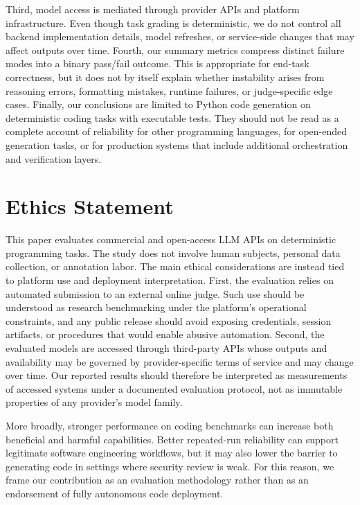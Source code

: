 \documentclass[11pt]{article}
\begin{document}
Third, model access is mediated through provider APIs and platform infrastructure. Even though task grading is deterministic, we do not control all backend implementation details, model refreshes, or service-side changes that may affect outputs over time. Fourth, our summary metrics compress distinct failure modes into a binary pass/fail outcome. This is appropriate for end-task correctness, but it does not by itself explain whether instability arises from reasoning errors, formatting mistakes, runtime failures, or judge-specific edge cases. Finally, our conclusions are limited to Python code generation on deterministic coding tasks with executable tests. They should not be read as a complete account of reliability for other programming languages, for open-ended generation tasks, or for production systems that include additional orchestration and verification layers.

\section{Ethics Statement}

This paper evaluates commercial and open-access LLM APIs on deterministic programming tasks. The study does not involve human subjects, personal data collection, or annotation labor. The main ethical considerations are instead tied to platform use and deployment interpretation. First, the evaluation relies on automated submission to an external online judge. Such use should be understood as research benchmarking under the platform's operational constraints, and any public release should avoid exposing credentials, session artifacts, or procedures that would enable abusive automation. Second, the evaluated models are accessed through third-party APIs whose outputs and availability may be governed by provider-specific terms of service and may change over time. Our reported results should therefore be interpreted as measurements of accessed systems under a documented evaluation protocol, not as immutable properties of any provider's model family.

More broadly, stronger performance on coding benchmarks can increase both beneficial and harmful capabilities. Better repeated-run reliability can support legitimate software engineering workflows, but it may also lower the barrier to generating code in settings where security review is weak. For this reason, we frame our contribution as an evaluation methodology rather than as an endorsement of fully autonomous code deployment.
\end{document}
